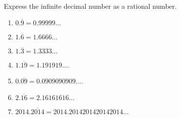 Express the infinite decimal number as a rational number.
\begin{multicols}{2}
\begin{enumerate}[ref={\fcProblemRef}]
\item $0.\overline{9}=0.99999\dots$

\item $1.\overline{6}=1.6666\dots$

\item $1.\overline{3}=1.3333\dots$

\item $1.\overline{19}=1.191919\dots$.

\item $0.\overline{09}=0.0909090909\dots $.

\item $2.\overline{16}=2.16161616\dots$

\item \label{problemExpressAsRational2014.20142014...} $2014.\overline{2014}=2014.2014201420142014\dots$

\end{enumerate}
\end{multicols}